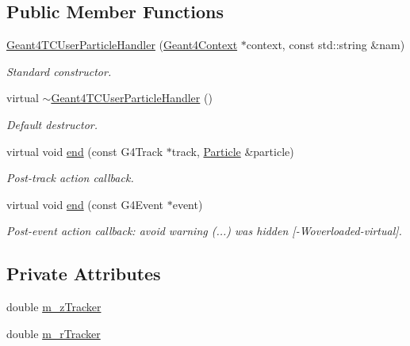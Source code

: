 \subsection*{Public Member Functions}
\begin{DoxyCompactItemize}
\item 
\hyperlink{class_d_d4hep_1_1_simulation_1_1_geant4_t_c_user_particle_handler_ab791641fc330c58512a0becaece51142}{Geant4TCUserParticleHandler} (\hyperlink{class_d_d4hep_1_1_simulation_1_1_geant4_context}{Geant4Context} $\ast$context, const std::string \&nam)
\begin{DoxyCompactList}\small\item\em Standard constructor. \item\end{DoxyCompactList}\item 
virtual \hyperlink{class_d_d4hep_1_1_simulation_1_1_geant4_t_c_user_particle_handler_adcf43ca266894019172cb24712daa9d0}{$\sim$Geant4TCUserParticleHandler} ()
\begin{DoxyCompactList}\small\item\em Default destructor. \item\end{DoxyCompactList}\item 
virtual void \hyperlink{class_d_d4hep_1_1_simulation_1_1_geant4_t_c_user_particle_handler_a1578be1e99f7f70c9d332cffb1ad2504}{end} (const G4Track $\ast$track, \hyperlink{class_d_d4hep_1_1_simulation_1_1_geant4_particle}{Particle} \&particle)
\begin{DoxyCompactList}\small\item\em Post-\/track action callback. \item\end{DoxyCompactList}\item 
virtual void \hyperlink{class_d_d4hep_1_1_simulation_1_1_geant4_t_c_user_particle_handler_ac51009a6e712d2b52d2470a5a1a7a03d}{end} (const G4Event $\ast$event)
\begin{DoxyCompactList}\small\item\em Post-\/event action callback: avoid warning (...) was hidden \mbox{[}-\/Woverloaded-\/virtual\mbox{]}. \item\end{DoxyCompactList}\end{DoxyCompactItemize}
\subsection*{Private Attributes}
\begin{DoxyCompactItemize}
\item 
double \hyperlink{class_d_d4hep_1_1_simulation_1_1_geant4_t_c_user_particle_handler_a79695432f91c1c1d7430f26e6a365a40}{m\_\-zTracker}
\item 
double \hyperlink{class_d_d4hep_1_1_simulation_1_1_geant4_t_c_user_particle_handler_a243303fc54a7945531d49aa1a0eeca7d}{m\_\-rTracker}
\end{DoxyCompactItemize}


